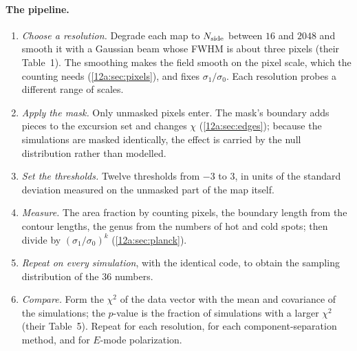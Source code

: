 \paragraph{The pipeline.}
\begin{enumerate}[itemsep=2pt,leftmargin=1.5em]
  \item \emph{Choose a resolution.} Degrade each map to $N_{\rm side}$ between $16$ and $2048$ and smooth it with a
        Gaussian beam whose FWHM is about three pixels (their Table~1). The smoothing makes the field smooth on the
        pixel scale, which the counting needs (\cref{12a:sec:pixels}), and fixes $\sigma_1/\sigma_0$. Each
        resolution probes a different range of scales.
  \item \emph{Apply the mask.} Only unmasked pixels enter. The mask's boundary adds pieces to the excursion set
        and changes $\chi$ (\cref{12a:sec:edges}); because the simulations are masked identically, the effect is
        carried by the null distribution rather than modelled.
  \item \emph{Set the thresholds.} Twelve thresholds from $-3$ to $3$, in units of the standard deviation measured
        on the unmasked part of the map itself.
  \item \emph{Measure.} The area fraction by counting pixels, the boundary length from the contour lengths, the
        genus from the numbers of hot and cold spots; then divide by $(\sigma_1/\sigma_0)^k$
        (\cref{12a:sec:planck}).
  \item \emph{Repeat on every simulation}, with the identical code, to obtain the sampling distribution of the
        $36$ numbers.
  \item \emph{Compare.} Form the $\chi^2$ of the data vector with the mean and covariance of the simulations; the
        $p$-value is the fraction of simulations with a larger $\chi^2$ (their Table~5). Repeat for each resolution,
        for each component-separation method, and for $E$-mode polarization.
\end{enumerate}

